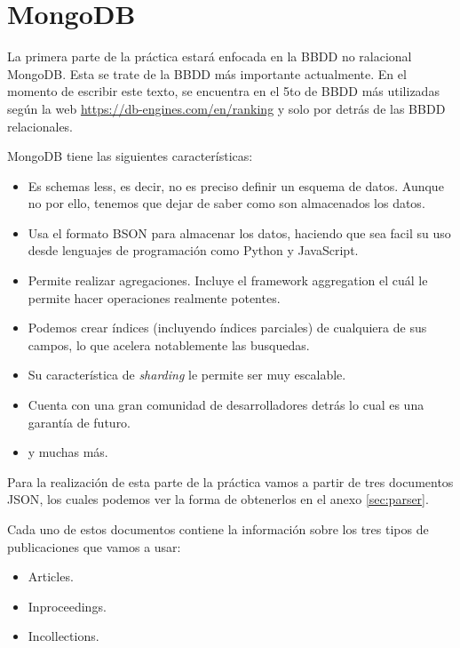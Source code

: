 \section{MongoDB}

La primera parte de la práctica estará enfocada en la \gls{BBDD} no ralacional MongoDB. Esta se trate de la \gls{BBDD} más importante actualmente. En el momento de escribir este texto, se encuentra en el 5to de \gls{BBDD} más utilizadas según la web \url{https://db-engines.com/en/ranking} y solo por detrás de las \gls{BBDD} relacionales.

MongoDB tiene las siguientes características:

\begin{itemize}
 \item Es schemas less, es decir, no es preciso definir un esquema de datos. Aunque no por ello, tenemos que dejar de saber como son almacenados los datos.
 \item Usa el formato BSON para almacenar los datos, haciendo que sea facil su uso desde lenguajes de programación como Python y JavaScript.
 \item Permite realizar agregaciones. Incluye el framework aggregation el cuál le permite hacer operaciones realmente potentes.
 \item Podemos crear índices (incluyendo índices parciales) de cualquiera de sus campos, lo que acelera notablemente las busquedas.
 \item Su característica de \textit{sharding} le permite ser muy escalable.
 \item Cuenta con una gran comunidad de desarrolladores detrás lo cual es una garantía de futuro.
 \item y muchas más.
\end{itemize}

Para la realización de esta parte de la práctica vamos a partir de tres documentos \gls{JSON}, los cuales podemos ver la forma de obtenerlos en el anexo \ref{sec:parser}.

Cada uno de estos documentos contiene la información sobre los tres tipos de publicaciones que vamos a usar:

\begin{itemize}
 \item Articles.
 \item Inproceedings.
 \item Incollections.
\end{itemize}


